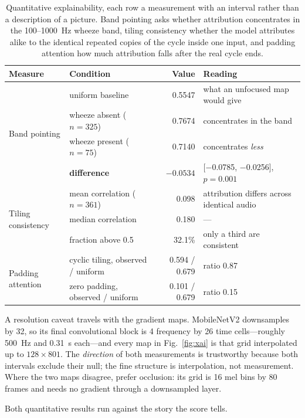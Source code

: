 \documentclass[journal,onecolumn]{IEEEtran}
\newcommand{\best}[1]{\textbf{#1}}
\begin{document}
\begin{table}[!t]
\centering
\caption{Quantitative explainability, each row a measurement with an interval rather than a
description of a picture. Band pointing asks whether attribution concentrates in the
100--1000~Hz wheeze band, tiling consistency whether the model attributes alike to the
identical repeated copies of the cycle inside one input, and padding attention how much
attribution falls after the real cycle ends.}
\label{tab:xaiquant}
\footnotesize
\begin{tabular}{llrl}
\toprule
Measure & Condition & Value & Reading \\
\midrule
\multirow{4}{*}{Band pointing}
 & uniform baseline & 0.5547 & what an unfocused map would give \\
 & wheeze absent ($n = 325$) & 0.7674 & concentrates in the band \\
 & wheeze present ($n = 75$) & 0.7140 & concentrates \emph{less} \\
 & \best{difference} & \best{$-0.0534$} & [$-$0.0785, $-$0.0256], $p = 0.001$ \\
\midrule
\multirow{3}{*}{Tiling consistency}
 & mean correlation ($n = 361$) & 0.098 & attribution differs across identical audio \\
 & median correlation & 0.180 & --- \\
 & fraction above 0.5 & 32.1\% & only a third are consistent \\
\midrule
\multirow{2}{*}{Padding attention}
 & cyclic tiling, observed / uniform & 0.594 / 0.679 & ratio 0.87 \\
 & zero padding, observed / uniform & 0.101 / 0.679 & ratio 0.15 \\
\bottomrule
\end{tabular}

\vspace{2pt}
\footnotesize A resolution caveat travels with the gradient maps. MobileNetV2 downsamples by
32, so its final convolutional block is 4 frequency by 26 time cells---roughly 500~Hz and
0.31~s each---and every map in Fig.~\ref{fig:xai} is that grid interpolated up to
$128 \times 801$. The \emph{direction} of both measurements is trustworthy because both
intervals exclude their null; the fine structure is interpolation, not measurement. Where the
two maps disagree, prefer occlusion: its grid is 16 mel bins by 80 frames and needs no gradient
through a downsampled layer.
\end{table}

Both quantitative results run against the story the score tells.
\end{document}

